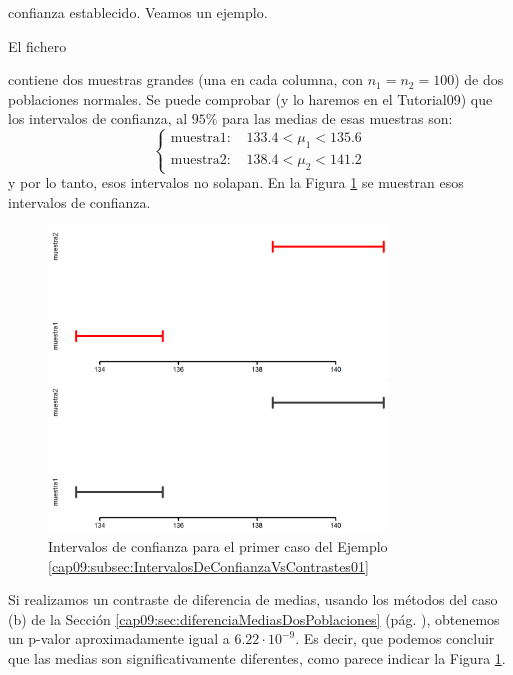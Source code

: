 confianza establecido. Veamos un ejemplo. \begin{ejemplo} \label{cap09:ejem:IntervalosVsContrastes}
El fichero
\begin{center}
\end{center}
contiene dos muestras grandes (una en cada columna, con $n_1=n_2=100$) de dos poblaciones normales.
Se puede comprobar (y lo haremos en el Tutorial09) que los intervalos de confianza, al $95\%$ para
las medias de esas muestras son:
\[
\begin{cases}
\mbox{muestra1: }&133.4<\mu_1<135.6\\
\mbox{muestra2: }&138.4<\mu_2<141.2
\end{cases}
\]
y por lo tanto, esos intervalos no solapan. En la Figura
\ref{cap09:fig:IntervalosDeConfianzaVsContrastes01} se muestran esos intervalos de confianza.

\begin{figure}[ht]
\begin{center}
\begin{enColor}
\includegraphics[width=9cm]{../fig/Cap09-IntervalosVsContrastes01.png}
\end{enColor}
\begin{bn}
\includegraphics[width=9cm]{../fig/Cap09-IntervalosVsContrastes01-bn.png}
\end{bn}
\caption{Intervalos de confianza para el primer caso del Ejemplo \ref{cap09:subsec:IntervalosDeConfianzaVsContrastes01}}
\label{cap09:fig:IntervalosDeConfianzaVsContrastes01}
\end{center}
\end{figure}
Si realizamos un contraste de diferencia de medias, usando los métodos del caso (b) de la Sección
\ref{cap09:sec:diferenciaMediasDosPoblaciones} (pág.
\pageref{cap09:sec:diferenciaMediasDosPoblaciones}), obtenemos un p-valor aproximadamente igual a
$6.22\cdot 10^{-9}$. Es decir, que podemos concluir que las medias son significativamente
diferentes, como parece indicar la Figura \ref{cap09:fig:IntervalosDeConfianzaVsContrastes01}.


\end{ejemplo}
